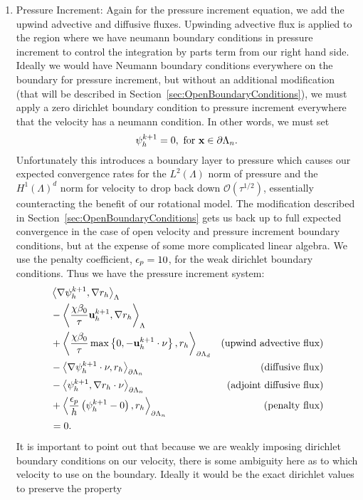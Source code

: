 \documentclass[letterpaper]{erdc}
\begin{document}
\begin{enumerate}
\item  Pressure Increment:  Again for the pressure increment equation, we add the upwind advective and diffusive fluxes.  Upwinding advective flux is applied to the region where we have neumann boundary conditions in pressure increment to control the integration by parts term from our right hand side.  Ideally we would have Neumann boundary conditions everywhere on the boundary for pressure increment, but without an additional modification (that will be described in Section~\ref{sec:OpenBoundaryConditions}), we must apply a zero dirichlet boundary condition to pressure increment everywhere that the velocity has a neumann condition.  In other words, we must set
\begin{equation}
  \psi^{k+1}_h = 0, \mbox{ for }\textbf{x}\in\partial\Lambda_n.
\end{equation}
Unfortunately this introduces a boundary layer to pressure which causes our expected convergence rates for the $L^2(\Lambda)$ norm of pressure and the $H^1(\Lambda)^d$ norm for velocity to drop back down $\mathcal{O}(\tau^{1/2})$, essentially counteracting the benefit of our rotational model.  The modification described in Section~\ref{sec:OpenBoundaryConditions} gets us back up to full expected convergence in the case of open velocity and pressure increment boundary conditions, but at the expense of some more complicated linear algebra.  We use the penalty coefficient, $\epsilon_p = 10$, for the weak dirichlet boundary conditions.  Thus we have the pressure increment system:
\begin{align*}
  &\left\langle  \nabla \psi^{k+1}_h,  \nabla r_h  \right\rangle_{\Lambda}&\\
  & - \left\langle  \frac{\chi\beta_0}{\tau} \textbf{u}^{k+1}_h,  \nabla r_h  \right\rangle_{\Lambda} &\\
  &+ \left\langle   \frac{\chi\beta_0}{\tau}\max\left\{0, -\textbf{u}^{k+1}_h\cdot\nu \right\} ,  r_h  \right\rangle_{\partial\Lambda_d}   &\mbox{(upwind advective flux)}\\
  &- \left\langle  \nabla \psi^{k+1}_h\cdot\nu,  r_h  \right\rangle_{\partial\Lambda_n}      &\mbox{(diffusive flux)}\\
  &- \left\langle  \psi^{k+1}_h,  \nabla r_h\cdot\nu  \right\rangle_{\partial\Lambda_n}      &\mbox{(adjoint diffusive flux)}\\
  &+ \left\langle  \frac{\epsilon_{p}}{h} \left(\psi^{k+1}_h - 0\right),  r_h  \right\rangle_{\partial\Lambda_n}        &\mbox{(penalty flux)}\\
  & = 0. &
\end{align*}
It is important to point out that because we are weakly imposing dirichlet boundary conditions on our velocity, there is some ambiguity here as to which velocity to use on the boundary.  Ideally it would be the exact dirichlet values to preserve the property

\end{enumerate}
\end{document}
